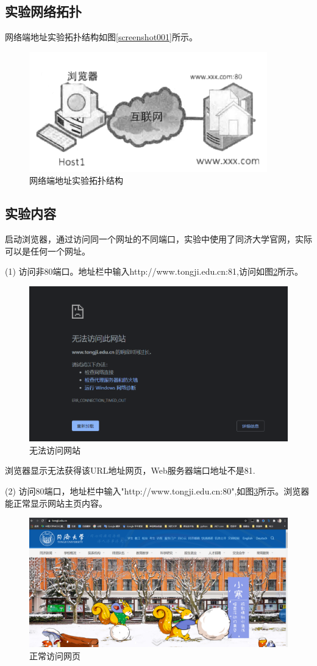 \documentclass[lang=cn,11pt,a4paper,cite=authoryear]{elegantpaper}
\begin{document}
\subsection{实验网络拓扑}
网络端地址实验拓扑结构如图\ref{screenshot001}所示。
\begin{figure}[htbp]
	\centering
	\includegraphics[width=0.7\linewidth]{image/screenshot001}
	\caption{网络端地址实验拓扑结构}
	\label{fig:screenshot001}
\end{figure}
\subsection{实验内容}
启动浏览器，通过访问同一个网址的不同端口，实验中使用了同济大学官网，实际可以是任何一个网址。

(1)	访问非80端口。地址栏中输入http://www.tongji.edu.cn:81,访问如图\ref{fig:screenshot003}所示。
\begin{figure}[htbp]
	\centering
	\includegraphics[width=0.7\linewidth]{image/screenshot003}
	\caption{无法访问网站}
	\label{fig:screenshot003}
\end{figure}

浏览器显示无法获得该URL地址网页，Web服务器端口地址不是81.

(2)	访问80端口，地址栏中输入"http://www.tongji.edu.cn:80",如图\ref{fig:screenshot002}所示。浏览器能正常显示网站主页内容。
\begin{figure}[htbp]
	\centering
	\includegraphics[width=0.7\linewidth]{image/screenshot002}
	\caption{正常访问网页}
	\label{fig:screenshot002}
\end{figure}
\end{document}
